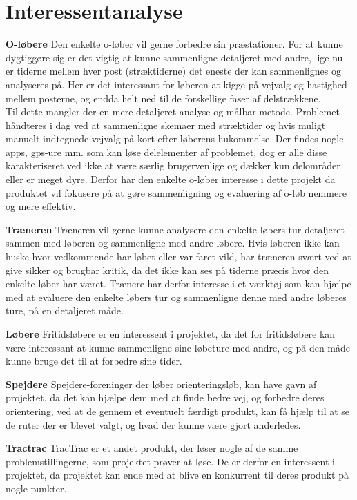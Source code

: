 \section{Interessentanalyse}
\textbf{O-løbere} \newline
Den enkelte o-løber vil gerne forbedre sin præstationer. For at kunne dygtiggøre sig er det vigtig at kunne sammenligne detaljeret med andre, lige nu er tiderne mellem hver post (stræktiderne) det eneste der kan sammenlignes og analyseres på. Her er det interessant for løberen at kigge på vejvalg og hastighed mellem posterne, og endda helt ned til de forskellige faser af delstrækkene. \\
Til dette mangler der en mere detaljeret analyse og målbar metode. Problemet håndteres i dag ved at sammenligne skemaer med stræktider og hvis muligt manuelt indtegnede vejvalg på kort efter løberens hukommelse. Der findes nogle apps, gps-ure mm. som kan løse delelementer af problemet, dog er alle disse karakteriseret ved ikke at være særlig brugervenlige og dækker kun delområder eller er meget dyre. Derfor har den enkelte o-løber interesse i dette projekt da produktet vil fokusere på at gøre sammenligning og evaluering af o-løb nemmere og mere effektiv.

\textbf{Træneren}\newline
Træneren vil gerne kunne analysere den enkelte løbers tur detaljeret sammen med løberen og sammenligne med andre løbere. Hvis løberen ikke kan huske hvor vedkommende har løbet eller var faret vild, har træneren svært ved at give sikker og brugbar kritik, da det ikke kan ses på tiderne præcis hvor den enkelte løber har været. Trænere har derfor interesse i et værktøj som kan hjælpe med at evaluere den enkelte løbers tur og sammenligne denne med andre løberes ture, på en detaljeret måde.

\textbf{Løbere}
Fritidsløbere er en interessent i projektet, da det for fritidsløbere kan være interessant at kunne sammenligne sine løbeture med andre, og på den måde kunne bruge det til at forbedre sine tider. 

\textbf{Spejdere}
Spejdere-foreninger der løber orienteringsløb, kan have gavn af projektet, da det kan hjælpe dem med at finde bedre vej, og forbedre deres orientering, ved at de gennem et eventuelt færdigt produkt, kan få hjælp til at se de ruter der er blevet valgt, og hvad der kunne være gjort anderledes. 


\textbf{Tractrac}
TracTrac er et andet produkt, der løser nogle af de samme problemstillingerne, som projektet prøver at løse. De er derfor en interessent i projektet, da projektet kan ende med at blive en konkurrent til deres produkt på nogle punkter. 



